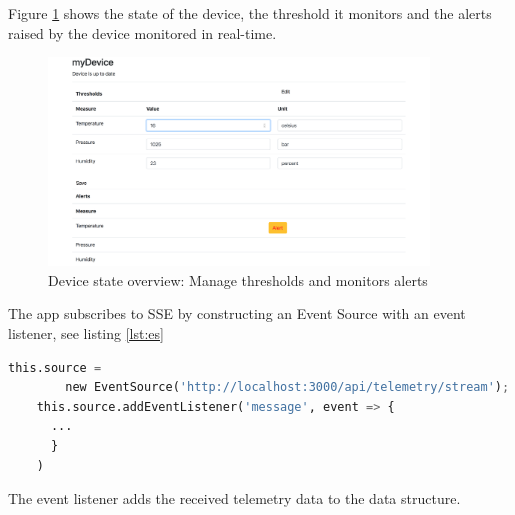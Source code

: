 Figure \ref{fig:deviceoverview} shows the state of the device, the threshold it monitors and the alerts raised by the device monitored in real-time.

\begin{figure}[H]
    \centering
    \includegraphics[width=0.9\textwidth]{figures/App/app_device_settings}
    \caption{Device state overview: Manage thresholds and monitors alerts}
    \label{fig:deviceoverview}
\end{figure}

The app subscribes to SSE by constructing an Event Source with an event listener, see listing \ref{lst:es}

\begin{lstlisting}[language=Python, caption=Event Source, label={lst:es}, basicstyle=\scriptsize]
    this.source = 
        new EventSource('http://localhost:3000/api/telemetry/stream');
    this.source.addEventListener('message', event => {
      ...
      }
    )
\end{lstlisting}

The event listener adds the received telemetry data to the data structure.